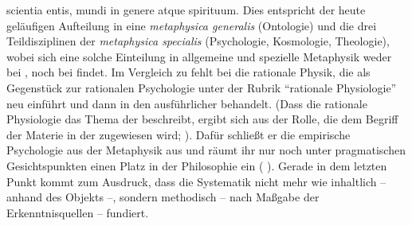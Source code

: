 \begin{nummerierung}
{{scientia entis, mundi in genere atque spirituum.} Dies entspricht der heute
geläufigen Aufteilung in eine \emph{metaphysica generalis} (Ontologie) und die drei
Teildisziplinen der \emph{metaphysica specialis} (Psychologie, Kosmologie, Theologie),
wobei sich eine solche Einteilung in allgemeine und spezielle Metaphysik weder
bei , noch bei  findet. Im Vergleich zu
 fehlt bei  die rationale Physik, die
 als Gegenstück zur rationalen Psychologie unter der Rubrik
\enquote{rationale Physiologie} neu einführt und dann in den
 ausführlicher
behandelt. \mkbibparens{Dass die rationale Physiologie das Thema der
 beschreibt, ergibt sich aus der Rolle, die
dem Begriff der Materie in der  zugewiesen wird;
\cite[vgl.][B 875\,f.,]{Kant:KritikderreinenVernunft2003}
\cite[][III: 547.23--548.4]{Kant:GesammelteWerke1900ff.}}. Dafür schließt er
die empirische Psychologie aus der Metaphysik aus und räumt ihr nur noch unter
pragmatischen Gesichtspunkten einen Platz in der Philosophie ein
\mkbibparens{\cite[vgl.][B~876\,f.,]{Kant:KritikderreinenVernunft2003}
\cite[][III: 548.9--28]{Kant:GesammelteWerke1900ff.}}. Gerade in dem letzten
Punkt kommt zum Ausdruck, dass  die Systematik nicht mehr wie
 inhaltlich -- anhand des Objekts --,
sondern methodisch -- nach Maßgabe der Erkenntnisquellen -- fundiert.}


\end{nummerierung}

